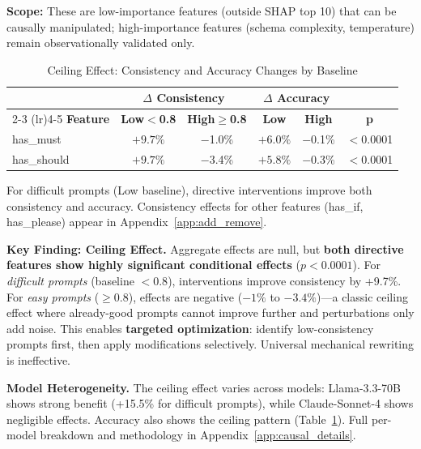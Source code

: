 \documentclass[sigconf,anonymous,review]{acmart}
\begin{document}
\textbf{Scope:} These are low-importance features (outside SHAP top 10) that can be causally manipulated; high-importance features (schema complexity, temperature) remain observationally validated only.

\begin{table}[t]
\centering
\caption{Ceiling Effect: Consistency and Accuracy Changes by Baseline}
\label{tab:causal_conditional}
\small
\begin{tabular}{@{}lccccc@{}}
\toprule
& \multicolumn{2}{c}{\textbf{$\Delta$ Consistency}} & \multicolumn{2}{c}{\textbf{$\Delta$ Accuracy}} & \\
\cmidrule(lr){2-3} \cmidrule(lr){4-5}
\textbf{Feature} & \textbf{Low$<$0.8} & \textbf{High$\geq$0.8} & \textbf{Low} & \textbf{High} & \textbf{p} \\
\midrule
has\_must & $\mathbf{+9.7\%}$ & $-$1.0\% & $\mathbf{+6.0\%}$ & $-$0.1\% & $<$0.0001 \\
has\_should & $\mathbf{+9.7\%}$ & $-$3.4\% & $\mathbf{+5.8\%}$ & $-$0.3\% & $<$0.0001 \\
\bottomrule
\end{tabular}
\vspace{0.3em}

\raggedright\footnotesize For difficult prompts (Low baseline), directive interventions improve both consistency and accuracy. Consistency effects for other features (has\_if, has\_please) appear in Appendix~\ref{app:add_remove}.
\end{table}

\textbf{Key Finding: Ceiling Effect.} Aggregate effects are null, but \textbf{both directive features show highly significant conditional effects} ($p < 0.0001$). For \textit{difficult prompts} (baseline $<0.8$), interventions improve consistency by +9.7\%. For \textit{easy prompts} ($\geq0.8$), effects are negative ($-1\%$ to $-3.4\%$)---a classic ceiling effect where already-good prompts cannot improve further and perturbations only add noise. This enables \textbf{targeted optimization}: identify low-consistency prompts first, then apply modifications selectively. Universal mechanical rewriting is ineffective.

\textbf{Model Heterogeneity.} The ceiling effect varies across models: Llama-3.3-70B shows strong benefit (+15.5\% for difficult prompts), while Claude-Sonnet-4 shows negligible effects. Accuracy also shows the ceiling pattern (Table~\ref{tab:causal_conditional}). Full per-model breakdown and methodology in Appendix~\ref{app:causal_details}.
\end{document}
